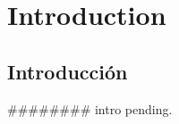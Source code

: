 \chapter{Introduction}
\section{Introducci\'on} %
\label{sec:intro}

{\color{Orange}\#\#\#\#\#\#\#\# intro pending.}

